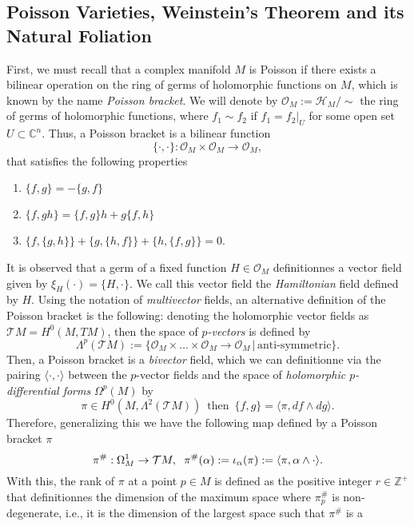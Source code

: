 \documentclass[12pt,twoside,a4paper]{report}
\newcommand{\zah}{\ensuremath{ \mathbb Z }}
\newcommand{\con}{\ensuremath{\mathbb{C}^n}}
\newcommand{\osheaf}{\ensuremath{\mathcal O }}
\begin{document}
\subsection{Poisson Varieties, Weinstein's Theorem and its Natural Foliation}
\noindent First, we must recall that a complex manifold $M$ is Poisson if there exists a bilinear operation on the ring of germs of
holomorphic functions on $M$, which is known by the name \emph{Poisson bracket}.
We will denote by $\osheaf_M:=\mathcal{H}_M/\sim$ the ring of germs of holomorphic functions, where $f_1\sim f_2$ if
$f_1=f_2|_U$ for some open set $U\subset\con$. Thus, a Poisson bracket is a bilinear function
\[
\{\cdot,\cdot\}:\osheaf_M\times\mathcal{O}_M\rightarrow\mathcal{O}_M,
\]
that satisfies the following properties
\begin{enumerate}
\item $\{f,g\} = -\{g,f\}$
\item $\{f,gh\}=\{f,g\}h + g\{f,h\}$
\item $\{f,\{g,h\}\}+\{g,\{h,f\}\} + \{h,\{ f,g\}\}=0$.
\end{enumerate}
\noindent It is observed that a germ of a fixed function $H\in\osheaf_M$ definitionnes a vector field given by $\xi_H(\cdot)=\{H,\cdot\}$.
We call this vector field the \emph{Hamiltonian} field defined by $H$. Using the notation of \emph{multivector} fields,
an alternative definition of the Poisson bracket is the following: denoting the holomorphic vector fields as $\mathcal{T}M=H^0(M,TM)$,
then the space of \emph{$p$-vectors} is defined by
\[
        \Lambda^{p}(\mathcal{T}M):=\{\osheaf_M\times\dots\times\mathcal{O}_M\rightarrow\mathcal{O}_M\,\vert\,\text{anti-symmetric}\}.
\]
Then, a Poisson bracket is a \emph{bivector} field, which we can definitionne via the pairing $\langle\cdot,\cdot\rangle$
between the $p$-vector fields and the space of \emph{holomorphic $p$-differential forms} $\Omega^{p}(M)$ by
\[
        \pi\in H^0(M,\Lambda^2(\mathcal{T}M))\,\text{ then }\,\{f,g\}=\langle \pi,df\wedge dg\rangle.
\]
Therefore, generalizing this we have the following map defined by a Poisson bracket $\pi$
\[
        \pi^{\#}:\Omega^1_M\rightarrow\mathcal{T}M,\hspace{0.2cm}\pi^{\#}(\alpha):=\iota_{\alpha}(\pi):=\langle\pi,\alpha\wedge\cdot\rangle.
\]
\noindent With this, the rank of $\pi$ at a point $p\in M$ is defined as the positive integer $r\in \zah^{+}$ that definitionnes the dimension of the
maximum space where $\pi^{\#}_p$ is non-degenerate, i.e., it is the dimension of the largest space such that $\pi^{\#}$ is a
\end{document}
